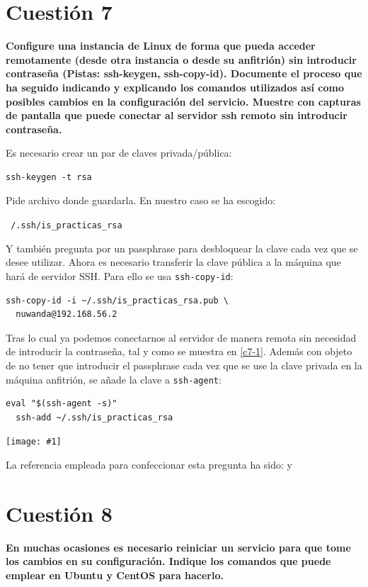 \documentclass[a4paper,11pt]{article}
\newenvironment{answer}{%
\begin{list}{}{%
}%
\item[]}{\end{list}}
\newcommand{\imagen}[4]{
  \begin{minipage}{\linewidth}
    \centering
    \texttt{[image: \#1]}
    \captionof{figure}{#2}
    \label{#3}
  \end{minipage} 
}
\begin{document}
\section{Cuestión 7}
\textbf{Configure una instancia de Linux de forma que pueda acceder remotamente (desde otra instancia o desde su anfitrión) 
sin introducir contraseña (Pistas: ssh-keygen, ssh-copy-id). Documente el proceso que ha seguido indicando y explicando los
comandos utilizados así como posibles cambios en la configuración del servicio. Muestre con capturas de pantalla que puede 
conectar al servidor ssh remoto sin introducir contraseña.}
\begin{answer}
  Es necesario crear un par de claves privada/pública:
  \begin{lstlisting}[style=BashInputStyle]
  ssh-keygen -t rsa
  \end{lstlisting}
  
  Pide archivo donde guardarla. En nuestro caso se ha escogido:\\
  \begin{center} \texttt{~/.ssh/is\_practicas\_rsa} \end{center}
  Y también pregunta por un passphrase para desbloquear la clave cada vez que se
  desee utilizar. Ahora es necesario transferir la clave pública a la máquina que hará de servidor SSH.
  Para ello se usa \texttt{ssh-copy-id}:
  \begin{lstlisting}[style=BashInputStyle]
  ssh-copy-id -i ~/.ssh/is_practicas_rsa.pub \
  nuwanda@192.168.56.2
  \end{lstlisting}
  
  Tras lo cual ya podemos conectarnos al servidor de manera remota sin necesidad
  de introducir la contraseña, tal y como se muestra en \ref{c7-1}. Además con objeto de
  no tener que introducir el passphrase cada vez que se use la clave privada
  en la máquina anfitrión, se añade la clave a \texttt{ssh-agent}:
  \begin{lstlisting}[style=BashInputStyle]
  eval "$(ssh-agent -s)"
  ssh-add ~/.ssh/is_practicas_rsa
  \end{lstlisting}
  
  \imagen{../images/2c7-1.jpeg}{SSH con publickey}{c7-1}{1}
  
  La referencia empleada para confeccionar esta pregunta ha sido: \cite{sshcopy} y 
  \cite{ssheval}
\end{answer}

\section{Cuestión 8}
\textbf{En muchas ocasiones es necesario reiniciar un servicio para que tome los cambios en su configuración. Indique los 
comandos que puede emplear en Ubuntu y CentOS para hacerlo.}
\begin{answer}
  
\end{answer}
\end{document}
